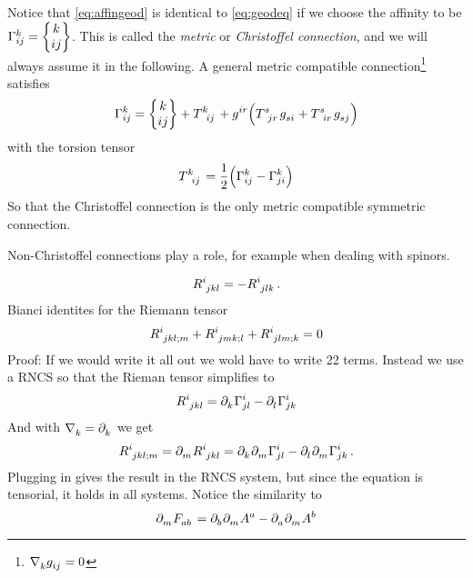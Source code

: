 Notice that \eqref{eq:affingeod} is identical to \eqref{eq:geodeq} if we choose
the affinity to be $\Gamma^{k}_{i j}=\begin{Bmatrix} k \\ i j \end{Bmatrix}$. This is called the
\emph{metric} or \emph{Christoffel connection}, and we will
always assume it in the following.
A general metric compatible
connection\footnote{$\tensor{\nabla}{_k}\tensor{g}{_i_j}=0$} satisfies
\begin{equation}
\affin{k}{i}{j}=\cSym{k}{i}{j}+\tensor{T}{^k_i_j}
+\tensor{g}{^i^r}\left(\tensor{T}{^s_j_r}\tensor{g}{_s_i}+\tensor{T}{^s_i_r}\tensor{g}{_s_j}\right)
\end{equation}
with the torsion tensor
\begin{equation}
\tensor{T}{^k_i_j}=\frac{1}{2}\left(\affin{k}{i}{j}-\affin{k}{j}{i}\right)
\end{equation}
So that the Christoffel connection is the only metric compatible symmetric
connection.
\begin{remark}
Non-Christoffel connections play a role, for example when dealing with spinors.
\end{remark}
\begin{equation}
\tensor{R}{^i_j_k_l}=-\tensor{R}{^i_j_l_k}\,.
\end{equation}
Bianci identites for the Riemann tensor
\begin{equation}
\tensor{R}{^i_j_k_l_{;m}}+\tensor{R}{^i_j_m_k_{;l}}+\tensor{R}{^i_j_l_m_{;k}}=0
\end{equation}
Proof: If we would write it all out we wold have to write 22 terms. Instead we
use a RNCS so that the Rieman tensor simplifies to 
\begin{equation}
\tensor{R}{^i_j_k_l}
=\tensor{\partial}{_k}\affin{i}{j}{l}
-\tensor{\partial}{_l}\affin{i}{j}{k}
\end{equation}
And with $\tensor{\nabla}{_k}=\tensor{\partial}{_k}$ we get
\begin{equation}
\tensor{R}{^i_j_k_l_{;m}}
=\tensor{\partial}{_m}\tensor{R}{^i_j_k_l}
=\tensor{\partial}{_k}\tensor{\partial}{_m}\affin{i}{j}{l}
-\tensor{\partial}{_l}\tensor{\partial}{_m}\affin{i}{j}{k}\,.
\end{equation}
Plugging in gives the result in the RNCS system, but since the equation is
tensorial, it holds in all systems. Notice the similarity to 
\begin{equation}
\tensor{\partial}{_m}\tensor{F}{_a_b}
=\tensor{\partial}{_b}\tensor{\partial}{_m}\tensor{A}{^a}
-\tensor{\partial}{_a}\tensor{\partial}{_m}\tensor{A}{^b}
\end{equation}

